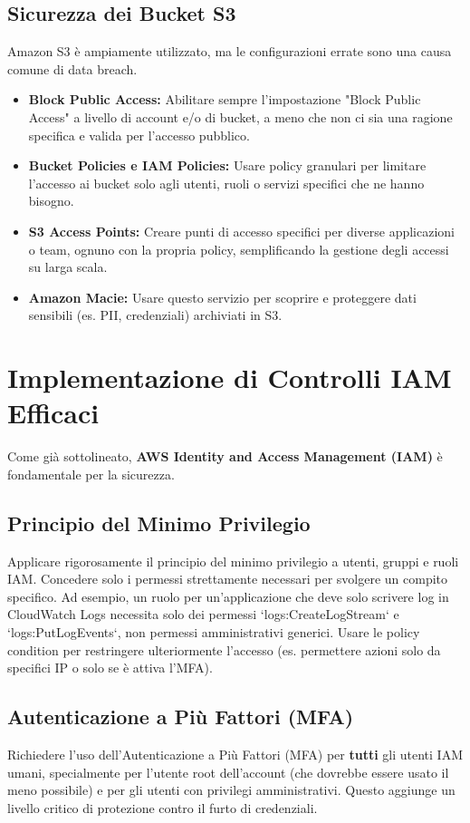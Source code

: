 \subsection{Sicurezza dei Bucket S3}
\label{subsec:s3-security}
Amazon S3 è ampiamente utilizzato, ma le configurazioni errate sono una causa comune di data breach.
\begin{itemize}
    \item \textbf{Block Public Access:} Abilitare sempre l'impostazione "Block Public Access" a livello di account e/o di bucket, a meno che non ci sia una ragione specifica e valida per l'accesso pubblico.
    \item \textbf{Bucket Policies e IAM Policies:} Usare policy granulari per limitare l'accesso ai bucket solo agli utenti, ruoli o servizi specifici che ne hanno bisogno.
    \item \textbf{S3 Access Points:} Creare punti di accesso specifici per diverse applicazioni o team, ognuno con la propria policy, semplificando la gestione degli accessi su larga scala.
    \item \textbf{Amazon Macie:} Usare questo servizio per scoprire e proteggere dati sensibili (es. PII, credenziali) archiviati in S3.
\end{itemize}

\section{Implementazione di Controlli IAM Efficaci}
\label{sec:iam-implementation}
Come già sottolineato, \textbf{AWS Identity and Access Management (IAM)} è fondamentale per la sicurezza.

\subsection{Principio del Minimo Privilegio}
\label{subsec:least-privilege-impl}
Applicare rigorosamente il principio del minimo privilegio a utenti, gruppi e ruoli IAM. Concedere solo i permessi strettamente necessari per svolgere un compito specifico. Ad esempio, un ruolo per un'applicazione che deve solo scrivere log in CloudWatch Logs necessita solo dei permessi `logs:CreateLogStream` e `logs:PutLogEvents`, non permessi amministrativi generici. Usare le policy condition per restringere ulteriormente l'accesso (es. permettere azioni solo da specifici IP o solo se è attiva l'MFA).

\subsection{Autenticazione a Più Fattori (MFA)}
\label{subsec:mfa-impl}
Richiedere l'uso dell'Autenticazione a Più Fattori (MFA) per \textbf{tutti} gli utenti IAM umani, specialmente per l'utente root dell'account (che dovrebbe essere usato il meno possibile) e per gli utenti con privilegi amministrativi. Questo aggiunge un livello critico di protezione contro il furto di credenziali.

